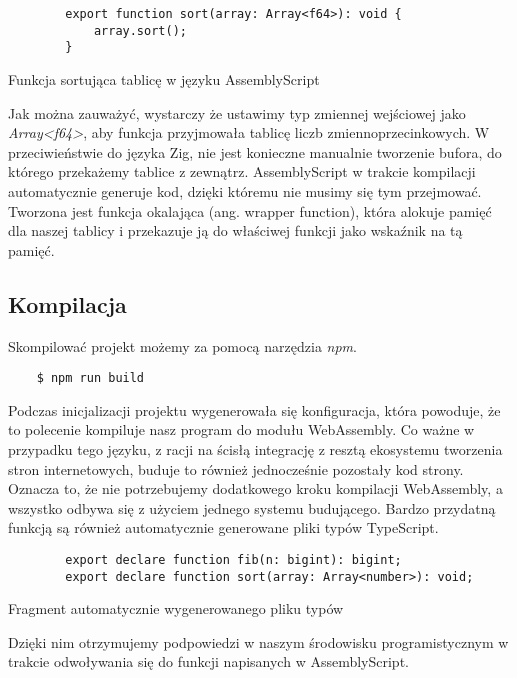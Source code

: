 \documentclass[language=polish,type=master]{aghmodern}
\begin{document}
\begin{listing}[H]
    \begin{verbatim}
        export function sort(array: Array<f64>): void {
            array.sort();
        }
    \end{verbatim}
    \caption{Funkcja sortująca tablicę w języku AssemblyScript}
\end{listing}

Jak można zauważyć, wystarczy że ustawimy typ zmiennej wejściowej jako \emph{Array<f64>}, aby funkcja przyjmowała tablicę liczb zmiennoprzecinkowych.
W przeciwieństwie do języka Zig, nie jest konieczne manualnie tworzenie bufora, do którego przekażemy tablice z zewnątrz.
AssemblyScript w trakcie kompilacji automatycznie generuje kod, dzięki któremu nie musimy się tym przejmować.
Tworzona jest funkcja okalająca (ang. wrapper function), która alokuje pamięć dla naszej tablicy i przekazuje ją do właściwej funkcji jako wskaźnik na tą pamięć.

\subsection{Kompilacja}
Skompilować projekt możemy za pomocą narzędzia \emph{npm}.

\begin{verbatim}
    $ npm run build
\end{verbatim}

Podczas inicjalizacji projektu wygenerowała się konfiguracja, która powoduje, że to polecenie kompiluje nasz program do modułu WebAssembly.
Co ważne w przypadku tego języku, z racji na ścisłą integrację z resztą ekosystemu tworzenia stron internetowych, buduje to również jednocześnie pozostały kod strony.
Oznacza to, że nie potrzebujemy dodatkowego kroku kompilacji WebAssembly, a wszystko odbywa się z użyciem jednego systemu budującego.
Bardzo przydatną funkcją są również automatycznie generowane pliki typów TypeScript.

\begin{listing}[H]
    \begin{verbatim}
        export declare function fib(n: bigint): bigint;
        export declare function sort(array: Array<number>): void;
    \end{verbatim}
    \caption{Fragment automatycznie wygenerowanego pliku typów}
\end{listing}

Dzięki nim otrzymujemy podpowiedzi w naszym środowisku programistycznym w trakcie odwoływania się do funkcji napisanych w AssemblyScript.
\end{document}
